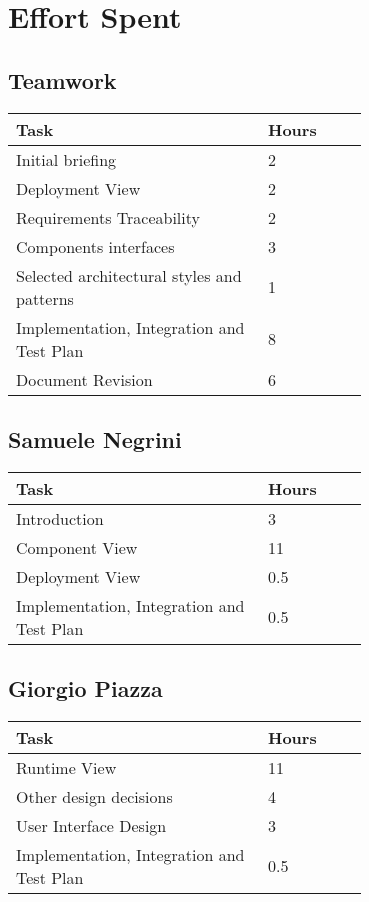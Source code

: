 \chapter{Effort Spent}

\section{Teamwork}
\vspace{2mm}
\begin{center}
    \begin{tabular}{@{}p{0.5\linewidth} p{0.2\linewidth}@{}}
        \hline
        \textbf{Task} & \textbf{Hours} \\ \hline
        Initial briefing & 2 \\ \hline
        Deployment View & 2 \\ \hline
        Requirements Traceability & 2\\ \hline
        Components interfaces & 3\\ \hline
        Selected architectural styles and patterns & 1\\ \hline
        Implementation, Integration and Test Plan & 8\\ \hline
        Document Revision & 6\\ \hline
    \end{tabular}
\end{center}

\section{Samuele Negrini}
\vspace{2mm}
\begin{center}
	\begin{tabular}{@{}p{0.5\linewidth} p{0.2\linewidth}@{}}
		\hline
		\textbf{Task} & \textbf{Hours} \\ \hline
		Introduction & 3 \\ \hline
		Component View & 11 \\ \hline
		Deployment View & 0.5 \\ \hline
		Implementation, Integration and Test Plan & 0.5\\ \hline
	\end{tabular}
\end{center}

\section{Giorgio Piazza}
\vspace{2mm}
\begin{center}
	\begin{tabular}{@{}p{0.5\linewidth} p{0.2\linewidth}@{}}
		\hline
		\textbf{Task} & \textbf{Hours} \\ \hline
		Runtime View & 11 \\ \hline
		Other design decisions & 4 \\ \hline
		User Interface Design & 3 \\ \hline
		Implementation, Integration and Test Plan & 0.5\\ \hline
	\end{tabular}
\end{center}